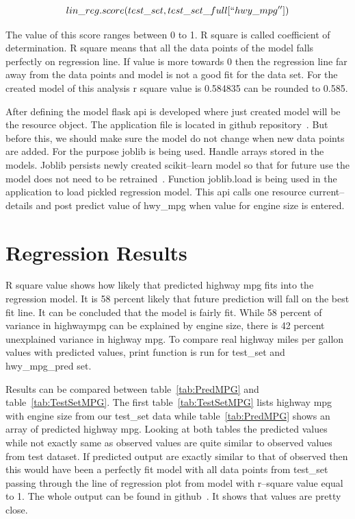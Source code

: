 \[lin\_reg.score(test\_set, test\_set\_full[``hwy\_mpg''])\]

The value of this score ranges between 0 to 1. R square is called
coefficient of determination. R square means that all the data points
of the model falls perfectly on regression line. If value is more
towards 0 then the regression line far away from the data points and
model is not a good fit for the data set. For the created model of
this analysis r square value is 0.584835 can be rounded to 0.585.
  
After defining the model flask api is developed where just created
model will be the resource object. The application file is located in
github repository~\cite{hid-sp18-415-regressionapi}. But before this,
we should make sure the model do not change when new data points are
added. For the purpose joblib is being used.  Handle arrays stored in
the models. Joblib persists newly created scikit--learn model so that
for future use the model does not need to be
retrained~\cite{hid-sp18-415-joblib}. Function joblib.load is being
used in the application to load pickled regression model. This api
calls one resource current--details and post predict value of hwy\_mpg
when value for engine size is entered.
   
  
\section{Regression Results}

R square value shows how likely that predicted highway mpg fits into
the regression model. It is 58 percent likely that future prediction
will fall on the best fit line. It can be concluded that the model is
fairly fit. While 58 percent of variance in highwaympg can be
explained by engine size, there is 42 percent unexplained variance in
highway mpg. To compare real highway miles per gallon values with
predicted values, print function is run for test\_set and
hwy\_mpg\_pred set.
 
Results can be compared between table~\ref{tab:PredMPG} and
table~\ref{tab:TestSetMPG}.  The first table~\ref{tab:TestSetMPG}
lists highway mpg with engine size from our test\_set data while
table~\ref{tab:PredMPG} shows an array of predicted highway mpg.
Looking at both tables the predicted values while not exactly same as
observed values are quite similar to observed values from test
dataset. If predicted output are exactly similar to that of observed
then this would have been a perfectly fit model with all data points
from test\_set passing through the line of regression plot from model
with r--square value equal to 1.  The whole output can be found in
github~\cite{hid-sp18-415-analysis}.  It shows that values are pretty
close.

